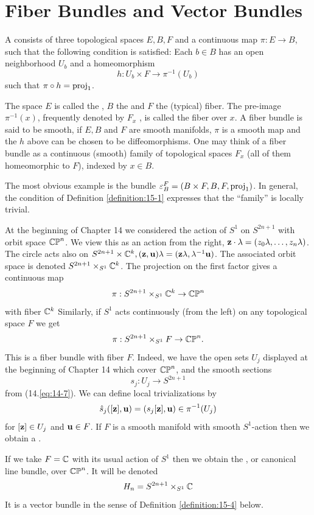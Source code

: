 \chapter{Fiber Bundles and Vector Bundles}
\begin{definition}\label{definition:15-1}
  A  consists of three topological spaces $E, B, F$ and a continuous 
  map $\pi:E\to B$, such that the following condition is satisfied: Each
  $b\in B$ has an open neighborhood $U_b$ and a homeomorphism
  \[
    h:U_b\times F\to \pi^{-1}(U_b)
  \]
  such that $\pi\circ h=\mathrm{proj}_1$.
\end{definition}

The space $E$ is called the , $B$ the  and $F$ the (typical) fiber.
The pre-image $\pi^{-1}(x)$, frequently denoted by $F_x$ , is called the fiber over $x$. A
fiber bundle is said to be smooth, if $E, B$ and $F$ are smooth manifolds, $\pi$ is a
smooth map and the $h$ above can be chosen to be diffeomorphisms. One may
think of a fiber bundle as a continuous (smooth) family of topological spaces $F_x$
(all of them homeomorphic to $F$), indexed by $x\in B$.


The most obvious example is the  bundle $\varepsilon_B^F = (B\times F, B, F, \mathrm{proj}_1)$.
In general, the condition of Definition \ref{definition:15-1} expresses that the ``family'' is locally
trivial.


\begin{example}\label{example:15-2}
  At the beginning of Chapter 14 we considered the action of $S^1$ on $S^{2n+1}$ with orbit space $\mathbb{CP}^n$. 
  We view this as an action from the right, $\mathbf{z}\cdot\lambda=(z_0\lambda,\ldots, z_n\lambda)$. The circle acts 
  also on $S^{2n+1}\times{\ensuremath{\mathbb{C}}}^k, (\mathbf{z}, \mathbf{u})\lambda = (\mathbf{z}\lambda, \lambda^{-1}\mathbf{u})$. The associated orbit 
  space is denoted $S^{2n+1}\times_{S^1}{\mathbb{C}}^k$. The projection on the first factor gives a continuous map
  \[
    \pi:S^{2n+1}\times_{S^1}{\mathbb{C}}^k\to \mathbb{CP}^n
  \]
  with fiber ${\mathbb{C}}^k$ Similarly, if $S^1$ acts continuously (from the left) on any topological
  space $F$ we get
  \[
    \pi:S^{2n+1}\times_{S^1}F\to \mathbb{CP}^n.
  \]
  This is a fiber bundle with fiber $F$. Indeed, we have the open sets $U_j$ displayed
  at the beginning of Chapter 14 which cover $\mathbb{CP}^n$, and the smooth sections
  \[
    s_j:U_j\to S^{2n+1}
  \]
  from (14.\ref{eq:14-7}). We can define local trivializations by
  \[
    \hat{s}_j([\mathbf{z}],\mathbf{u}) = (s_j[\mathbf{z}], \mathbf{u})\in\pi^{-1}(U_j)
  \]
  for $[\mathbf{z}]\in U_j$ and $\mathbf{u}\in F$. If $F$ is a smooth manifold with smooth $S^1$-action then
  we obtain a .

  If we take $F = {\mathbb{C}}$ with its usual action of $S^1$ then we obtain the ,
  or canonical line bundle, over $\mathbb{CP}^n$. It will be denoted
  \[
    H_n = S^{2n+1}\times_{S^1}{\mathbb{C}}
  \]
  It is a vector bundle in the sense of Definition \ref{definition:15-4} below.
\end{example}

